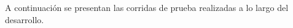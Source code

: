 
A continuación se presentan las corridas de prueba realizadas a lo largo del desarrollo. \\












